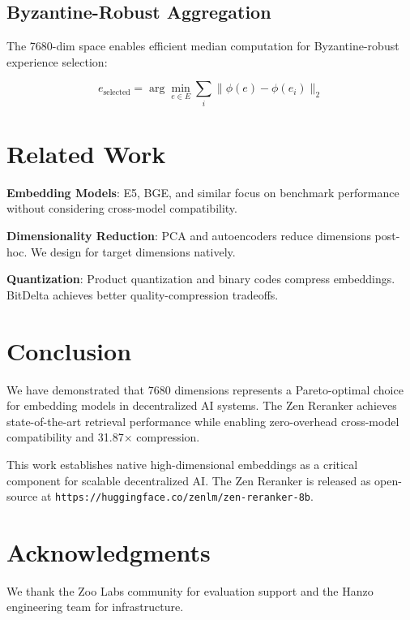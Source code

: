 \documentclass[11pt,letterpaper]{article}
\begin{document}
\subsection{Byzantine-Robust Aggregation}

The 7680-dim space enables efficient median computation for Byzantine-robust experience selection:

\begin{equation}
e_{\text{selected}} = \arg\min_{e \in E} \sum_{i} \|\phi(e) - \phi(e_i)\|_2
\end{equation}

\section{Related Work}

\textbf{Embedding Models}: E5, BGE, and similar focus on benchmark performance without considering cross-model compatibility.

\textbf{Dimensionality Reduction}: PCA and autoencoders reduce dimensions post-hoc. We design for target dimensions natively.

\textbf{Quantization}: Product quantization and binary codes compress embeddings. BitDelta achieves better quality-compression tradeoffs.

\section{Conclusion}

We have demonstrated that 7680 dimensions represents a Pareto-optimal choice for embedding models in decentralized AI systems. The Zen Reranker achieves state-of-the-art retrieval performance while enabling zero-overhead cross-model compatibility and 31.87$\times$ compression.

This work establishes native high-dimensional embeddings as a critical component for scalable decentralized AI. The Zen Reranker is released as open-source at \texttt{https://huggingface.co/zenlm/zen-reranker-8b}.

\section*{Acknowledgments}

We thank the Zoo Labs community for evaluation support and the Hanzo engineering team for infrastructure.
\end{document}
